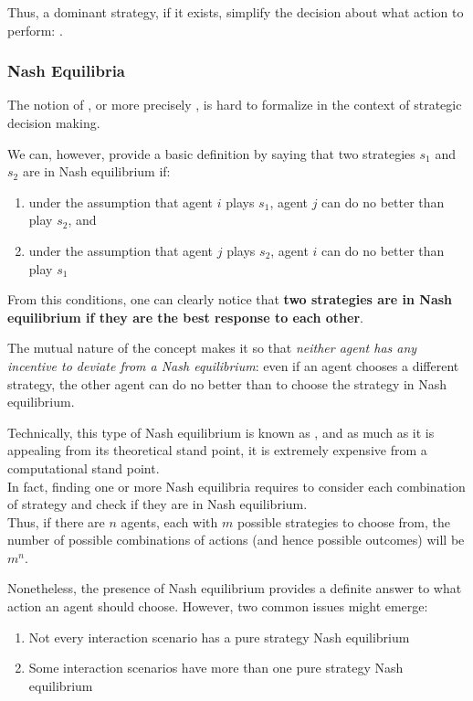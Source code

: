 		Thus, a dominant strategy, if it exists, simplify the decision about what action to perform: \cite{mastxt}.

\subsubsection{Nash Equilibria}
The notion of , or more precisely , is hard to formalize in the context of strategic decision making.
		
		We can, however, provide a basic definition by saying that two strategies $s_1$ and $s_2$ are in Nash equilibrium if:
		\begin{enumerate}
		\item under the assumption that agent $i$ plays $s_1$, agent $j$ can do no better than play $s_2$, and
		\item under the assumption that agent $j$ plays $s_2$, agent $i$ can do no better than play $s_1$
		\end{enumerate}
		From this conditions, one can clearly notice that \textbf{two strategies are in Nash equilibrium if they are the best response to each other}.
		
		The mutual nature of the concept makes it so that \emph{neither agent has any incentive to deviate from a Nash equilibrium}: even if an agent chooses a different strategy, the other agent can do no better than to choose the strategy in Nash equilibrium.
		
		Technically, this type of Nash equilibrium is known as , and as much as it is appealing from its theoretical stand point, it is extremely expensive from a computational stand point.\\
		In fact, finding one or more Nash equilibria requires to consider each combination of strategy and check if they are in Nash equilibrium.\\
		Thus, if there are $n$ agents, each with $m$ possible strategies to choose from, the number of possible combinations of actions (and hence possible outcomes) will be $m^n$.
		
		Nonetheless, the presence of Nash equilibrium provides a definite answer to what action an agent should choose. However, two common issues might emerge:
		\begin{enumerate}
		\item Not every interaction scenario has a pure strategy Nash equilibrium
		\item Some interaction scenarios have more than one pure strategy Nash equilibrium
		\end{enumerate}
		
